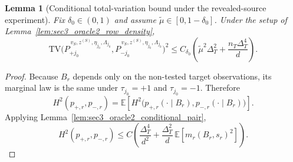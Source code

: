 \documentclass[10pt]{article}
\newtheorem{lemma}{Lemma}
\newcommand{\Ebb}{\mathbb E}
\newcommand{\TV}{\mathrm{TV}}
\newcommand{\trg}{T}
\newcommand{\nT}{n_{\trg}}
\newcommand{\DeltaT}{\Delta_{\trg}}
\newcommand{\src}{S}
\newcommand{\zsrc}{z^{(\src)}}
\begin{document}
\begin{lemma}[Conditional total-variation bound under the revealed-source experiment]
\label{lem:sec3_oracle2_conditional_tv}
Fix $\delta_0\in(0,1)$ and assume $\tilde\mu\in[0,1-\delta_0]$. Under the setup
of Lemma~\ref{lem:sec3_oracle2_row_density},
\begin{equation}
\label{eq:sec3_oracle2_conditional_tv}
    \TV\!\bigl(
        P_{+j_0}^{\,v_{\src},\zsrc,\eta_{j_0},\Lambda_{j_0}},
        P_{-j_0}^{\,v_{\src},\zsrc,\eta_{j_0},\Lambda_{j_0}}
    \bigr)^2
    \le
    C_{\delta_0}\left(
        \tilde\mu^2\DeltaT^2
        +
        \frac{\nT\DeltaT^4}{d}
    \right).
\end{equation}
\end{lemma}

\begin{proof}
Because $B_r$ depends only on the non-tested target observations, its marginal
law is the same under $\tau_{j_0}=+1$ and $\tau_{j_0}=-1$. Therefore
\[
    H^2(p_{+,r},p_{-,r})
    =
    \Ebb\!\left[
        H^2\!\bigl(
            p_{+,r}(\cdot\mid B_r),
            p_{-,r}(\cdot\mid B_r)
        \bigr)
    \right].
\]
Applying Lemma~\ref{lem:sec3_oracle2_conditional_pair},
\[
    H^2(p_{+,r},p_{-,r})
    \le
    C\left(
        \frac{\DeltaT^4}{d^2}+\frac{\DeltaT^2}{d}\,\Ebb[m_r(B_r,s_r)^2]
    \right).
\]


\end{proof}
\end{document}

